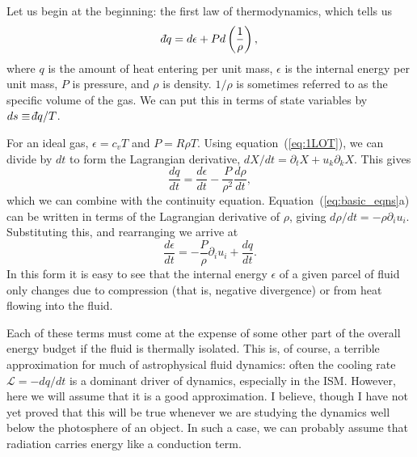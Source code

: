\documentclass[letterpaper,12pt]{paper}
\def\dbar{{\mathchar'26\mkern-12mu d}}
\begin{document}
Let us begin at the beginning: the first law of thermodynamics, which
tells us 
\begin{equation}
  \label{eq:1LOT}
  \dbar q = d\epsilon + P d \left(\frac{1}{\rho}\right),
\end{equation}
where $q$ is the amount of heat entering per unit mass, $\epsilon$ is
the internal energy per unit mass, $P$ is pressure, and $\rho$ is
density. $1/\rho$ is sometimes referred to as the specific volume of
the gas. We can put this in terms of state variables by
$ds \equiv \dbar q/T$. 

For an ideal gas, $\epsilon = c_v T$ and $P  = R \rho T$. Using
equation~(\ref{eq:1LOT}), we can divide by $dt$ to form the Lagrangian
derivative, $dX/dt = \partial_t X + u_k \partial_k X$. This gives
\begin{equation}
  \label{eq:heat}
  \frac{dq}{dt} = \frac{d\epsilon}{dt} - \frac{P}{\rho^2} \frac{d\rho}{dt},
\end{equation}
which we can combine with the continuity
equation. Equation~(\ref{eq:basic_eqns}a) can be written in terms of
the Lagrangian derivative of $\rho$, giving $d\rho/dt =
-\rho \partial_i u_i$. Substituting this, and rearranging we arrive at
\begin{equation}
  \label{eq:int_en}
  \frac{d\epsilon}{dt} = - \frac{P}{\rho} \partial_i u_i + \frac{dq}{dt}.
\end{equation}
In this form it is easy to see that the internal energy $\epsilon$ of
a given parcel of fluid only changes due to compression (that is,
negative divergence) or from heat flowing into the fluid. 

Each of these terms must come at the expense of some other part of the
overall energy budget if the fluid is thermally isolated. This is, of
course, a terrible approximation for much of astrophysical fluid
dynamics: often the cooling rate $\mathcal{L} = - dq/dt$ is a dominant
driver of dynamics, especially in the ISM. However, here we will
assume that it is a good approximation. I believe, though I have not
yet proved that this will be true whenever we are studying the
dynamics well below the photosphere of an object. In such a case, we
can probably assume that radiation carries energy like a conduction
term. 
\end{document}
